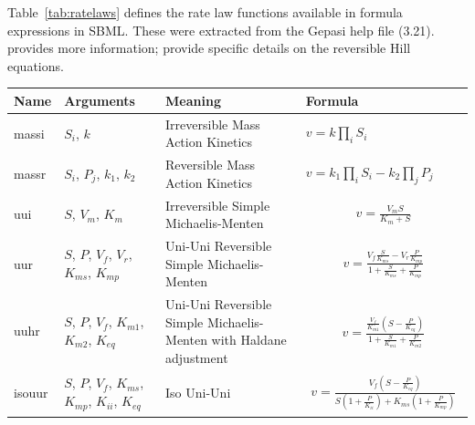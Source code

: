 \documentclass[10pt]{cekarticle}
\newcommand{\D}{\displaystyle}
\begin{document}
Table~\ref{tab:ratelaws} defines the rate law functions available in
formula expressions in SBML.  These were extracted from the Gepasi help
file (3.21).  \citet{segel:1993} provides more information;
\citet{hofmeyr:1997} provide specific details on the reversible Hill
equations.

\begin{table}[ht]
\setlength{\abovedisplayskip}{-2pt}
\setlength{\belowdisplayskip}{1pt}
\begin{tabular}{|m{0.5in}|>{\raggedright}m{0.77in}|>{\raggedright}m{1.5in}|m{3.03in}|}
\hline
\textbf{Name} & \textbf{Arguments} & \textbf{Meaning} &
\textbf{Formula} \\
\hline

massi & $S_i$, $k$ & Irreversible Mass Action Kinetics &
$v = k \prod_i S_i$
\\ \hline

massr & $S_i$, $P_j$, $k_1$, $k_2$ & Reversible Mass Action Kinetics  &
$v = k_1 \prod_i S_i - k_2 \prod_j P_j$
\\ \hline

uui & $S$, $V_m$, $K_m$ & Irreversible Simple Michaelis-Menten  &
\begin{gather*}
v = \frac{V_m S}{K_m + S}
\end{gather*}
\\ \hline

uur & $S$, $P$, $V_f$, $V_r$, $K_{ms}$, $K_{mp}$ & Uni-Uni Reversible Simple
Michaelis-Menten &
\begin{gather*}
v = \frac{V_f \frac{\D S}{\D
K_{ms}} - V_r \frac{\D P}{\D K_{mp}}}{1 + \frac{\D S}{\D K_{ms}} +
\frac{\D P}{\D K_{mp}} }
\end{gather*}
\\ \hline

uuhr & $S$, $P$, $V_f$, $K_{m1}$, $K_{m2}$, $K_{eq}$ & Uni-Uni
Reversible Simple Michaelis-Menten with Haldane adjustment &
\begin{gather*}
v = \frac{\frac{V_f}{K_{m1}} \left(S -
\frac{P}{K_{eq}} \right)}{1 + \frac{S}{K_{m1}} + \frac{P}{K_{m2}}}
\end{gather*}
\\ \hline

isouur & $S$, $P$, $V_f$, $K_{ms}$, $K_{mp}$, $K_{ii}$, $K_{eq}$ & Iso Uni-Uni &
\begin{gather*}
v = \frac{V_f \left(S - \frac{P}{K_{eq}}\right)}{S \left(1
+ \frac{P}{K_{ii}}\right) + K_{ms} \left(1 + \frac{P}{K_{mp}}\right)}
\end{gather*}
\\ \hline


\end{tabular}
\end{table}
\end{document}
